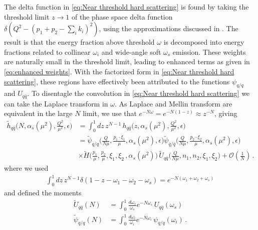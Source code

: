 The delta function in \cref{eq:Near threshold hard scattering} is found by taking the threshold limit $z\rightarrow 1$ of the phase space delta function $\delta(Q^{2}-(p_1+p_2-\sum_{i}k_{i})^{2})$, using the approximations discussed in \cite{Sterman:1986aj}. The result is that the energy fraction above threshold $\omega$ is decomposed into energy fractions related to collinear $\omega_i$ and wide-angle soft $\omega_s$ emission. These weights are naturally small in the threshold limit, leading to enhanced terms as given in \cref{eq:enhanced weights}. With the factorized form in \cref{eq:Near threshold hard scattering}, these regions have effectively been attributed to the functions $\psi_{q/q}$ and $U_{q\bar{q}}$. To disentagle the convolution in \cref{eq:Near threshold hard scattering} we can take the Laplace transform in $\omega$. As Laplace and Mellin transform are equivalent in the large $N$ limit, we use that $e^{-N\omega}=e^{-N(1-z)}\approx z^{-N}$, giving
\begin{align}\label{eq:refactorized hard function mellin}
    \tilde{h}_{q\bar{q}}\Big(N,\alpha_{s}(\mu^{2}),\frac{Q^{2}}{\mu^{2}},\epsilon\Big)&=\int_{0}^{1}dz\, z^{N-1}\, h_{q\bar{q}}\Big(z,\alpha_{s}(\mu^{2}),\frac{Q^{2}}{\mu^{2}},\epsilon\Big)\nonumber
    \\
    &=\tilde{\psi}_{q/q}\Big(\frac{Q}{N\mu},\frac{p_1\cdot\xi_1}{\mu},\alpha_{s}(\mu^{2}),\epsilon\Big)\tilde{\psi}_{\bar{q}/\bar{q}}\Big(\frac{Q}{N\mu},\frac{p_2\cdot\xi_2}{\mu},\alpha_{s}(\mu^{2}),\epsilon\Big)\nonumber
    \\
    &\times \tilde{H}\Big(\frac{p_1}{\mu},\frac{p_2}{\mu},\xi_1,\xi_2\,,\alpha_{s}(\mu^{2})\Big)\,\tilde{U}_{q\bar{q}}\Big(\frac{Q}{N\mu},n_1,n_2,\xi_1,\xi_2\Big)+\mathcal{O}(\frac{1}{N})\,.
\end{align}
where we used
\begin{align}
    \int_{0}^{1}dz\,z^{N-1}\delta(1-z-\omega_1-\omega_2-\omega_s)=e^{-N(\omega_1+\omega_2+\omega_s)}
\end{align}
and defined the moments
\begin{align}
    \tilde{U}_{q\bar{q}}(N)&=\int_{0}^{1}\frac{d\omega_s}{\omega_s}e^{-N\omega_s}\,U_{q\bar{q}}(\omega_s)
    \\
    \tilde{\psi}_{q/q}(N)&=\int_{0}^{1}\frac{d\omega_i}{\omega_i}e^{-N\omega_i}\,\psi_{q/q}(\omega_i)\,.
\end{align}

